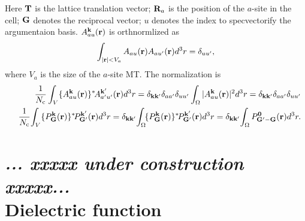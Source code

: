 \documentclass[a4paper,10pt,fleqn]{article}
\def\underconstruction{{\it... xxxxx under construction xxxxx...\\}}
\begin{document}
Here ${\bf T}$ is the lattice translation vector;
${\bf R}_a$ is the position of the $a$-site in the cell;
${\bf G}$ denotes the reciprocal vector; %
$u$ denotes the index to specvectorify the argumentaion basis. 
$A^{\bf k}_{a u}({\bf r})$ is orthnormlized as
\begin{eqnarray}
\int_{|{\bf r}| < V_a} A_{a u}({\bf r})A_{a u'}({\bf r}) d^3r =\delta_{u u'},
\end{eqnarray}
where $V_a$ is the size of the $a$-site MT.
The normalization is
\begin{eqnarray}
&&
\frac{1}{N_{\rm c}}\int_V \{A^{\bf k}_{a u}({\bf r})\}^* 
\!A^{\bf k'}_{a' u'}({\bf r}) d^3r = 
\delta_{\bf k k'} \delta_{aa'}\delta_{u u'}
\int_\Omega |A^{\bf k}_{a u}({\bf r})|^2 d^3r
= \delta_{\bf k k'} \delta_{aa'}\delta_{u u'} \\
&&\frac{1}{N_{\rm c}}\!
\int_V  \{ P^{\bf k}_{\bf G}({\bf r})\}^*\!
P^{\bf k'}_{\bf G'}({\bf r})  d^3r
= \delta_{\bf k k'}\!
\int_\Omega \!\{ P^{\bf k}_{\bf G}({\bf r}) \}^*\!
P^{\bf k'}_{\bf G'}({\bf r})  d^3r
= \delta_{\bf k k'}\!
\int_\Omega  P^{\bf 0}_{\bf G'-G}({\bf r}) d^3r.
\end{eqnarray}


%


%

\section{\underconstruction Dielectric function }
\end{document}
